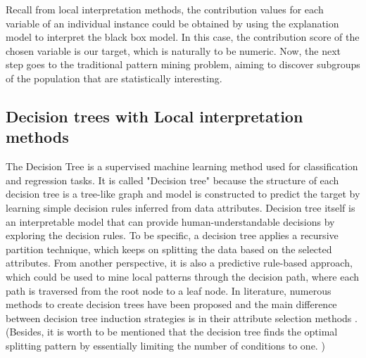 Recall from local interpretation methods, the contribution values for each variable of an individual instance could be obtained by using the explanation model to interpret the black box model. In this case, the contribution score of the chosen variable is our target, which is naturally to be numeric. Now, the next step goes to the traditional pattern mining problem, aiming to discover subgroups of the population that are statistically interesting. 


\subsection{Decision trees with Local interpretation methods}

The Decision Tree is a supervised machine learning method used for classification and regression tasks. It is called "Decision tree" because the structure of each decision tree is a tree-like graph and model is constructed to predict the target by learning simple decision rules inferred from data attributes. Decision tree itself is an interpretable model that can provide human-understandable decisions by exploring the decision rules. To be specific, a decision tree applies a recursive partition technique, which keeps on splitting the data based on the selected attributes. From another perspective, it is also a predictive rule-based approach, which could be used to mine local patterns through the decision path, where each path is traversed from the root node to a leaf node. In literature, numerous methods to create decision trees have been proposed and the main difference between decision tree induction strategies is in their attribute selection methods \cite{quinlan1986induction}. 
(Besides, it is worth to be mentioned that the decision tree finds the optimal splitting pattern by essentially limiting the number of conditions to one. \cite{zimmermann2009cluster})



